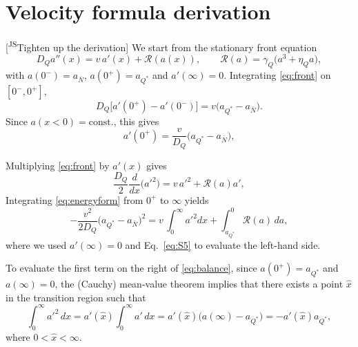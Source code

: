 \documentclass[10pt,superscriptaddress,
amsmath,aps,prl,twocolumn,nofootinbib]{revtex4-1}
\newcommand{\JScom}[1]{\textsf{\color{violet} [\textsuperscript{JS}#1]}}
\newcommand{\aQstar}{\ensuremath{a_{Q^*}}}
\newcommand{\Nbar}{{\ensuremath{\bar N}}}
\begin{document}
\section{Velocity formula derivation}
\label{sec:v_analytical_derivation}

\JScom{Tighten up the derivation}
We start from the stationary front equation
\begin{equation}
    D_Q a''(x) = v\,a'(x) + \mathcal{R}(a(x)),
    \qquad
    \mathcal{R}(a) = \gamma_Q\bigl(a^3 + \eta_Q a\bigr),
    \label{eq:front}
\end{equation}
with $a(0^-)=a_\Nbar$, $a(0^+)=\aQstar$ and $a'(\infty)=0$.
Integrating \eqref{eq:front} on $[0^-,0^+]$,
\begin{equation}
    D_Q\bigl[a'(0^+) - a'(0^-)\bigr]
    = v\bigl(\aQstar-a_\Nbar\bigr).
\end{equation}
Since $a(x<0)=\mathrm{const.}$, this gives
\begin{equation}
    a'(0^+) = \frac{v}{D_Q}\bigl(\aQstar-a_\Nbar\bigr),
    \label{eq:S5}
\end{equation}

Multiplying \eqref{eq:front} by $a'(x)$ gives
\begin{equation}
    \frac{D_Q}{2}\frac{d}{dx}\bigl(a'^2\bigr)
    = v\,a'^2 + \mathcal{R}(a)a',
    \label{eq:energyform}
\end{equation}
Integrating \eqref{eq:energyform} from $0^+$ to $\infty$ yields
\begin{equation}
    -\frac{v^2}{2D_Q}\bigl(\aQstar-a_\Nbar\bigr)^2
    = v\,\int_{0}^{\infty}a'^2dx
      +\int^{0}_{\aQstar}\mathcal{R}(a)\,da,
    \label{eq:balance}
\end{equation}
where we used $a'(\infty)=0$ and Eq.~\eqref{eq:S5} to evaluate the left-hand side.

To evaluate the first term on the right of \eqref{eq:balance}, since $a(0^+)=\aQstar$ and
$a(\infty)=0$, the (Cauchy) mean-value theorem implies that there exists a point
$\hat{x}$ in the transition region such that
\begin{equation}
    \int_{0}^{\infty} a'^2\,dx
    = a'(\hat{x})\int_{0}^{\infty} a'\,dx
    = a'(\hat{x})\big(a(\infty) - \aQstar\big) 
    = -a'(\hat{x})\aQstar ,
    \label{eq:MVT_step}
\end{equation}
where $0<\hat{x}<\infty$.
\end{document}
